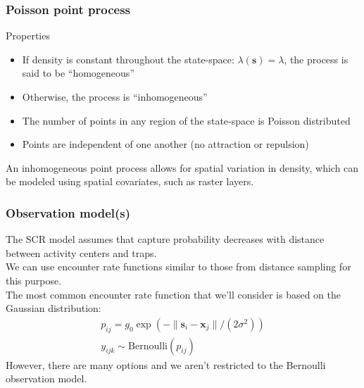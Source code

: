 \documentclass[color=usenames,dvipsnames]{beamer}\usepackage[]{graphicx}\usepackage[]{color}
\newcommand{\bxj}{{\bm x}_j}
\newcommand{\bs}{{\bm s}}
\newcommand{\bsi}{{\bm s}_i}
\newcommand{\dsixj}{\|\bsi - \bxj\|}
\begin{document}
\begin{frame}
  \frametitle{Poisson point process}
  Properties
  \begin{itemize}
    \item If density is constant throughout the state-space:
      $\lambda(\bs) = \lambda$, the process is said to be
      ``homogeneous''
    \item Otherwise, the process is ``inhomogeneous''
    \item The number of points in any region of the state-space is
      Poisson distributed
    \item Points are independent of one another (no attraction or
      repulsion) 
  \end{itemize}
  \pause
  \vfill
  An inhomogeneous point process allows for spatial variation
  in density, which can be modeled using \alert{spatial covariates},
  such as raster layers. \\
\end{frame}




\begin{frame}
  \frametitle{Observation model(s)}
  The SCR model assumes that capture probability decreases with
  distance between activity centers and traps. \\
  \pause
  \vfill
  We can use encounter rate functions similar to those from distance 
  sampling for this purpose. \\
  \pause
  \vfill
  The most common encounter rate function that we'll consider is based
  on the Gaussian distribution:
  \begin{gather*}
    p_{ij} = g_0\exp(-\dsixj/(2\sigma^2)) \\
    y_{ijk} \sim \mathrm{Bernoulli}(p_{ij}) 
  \end{gather*}
  \pause
  However, there are many options and we aren't restricted to the
  Bernoulli observation model. 
\end{frame}
\end{document}
